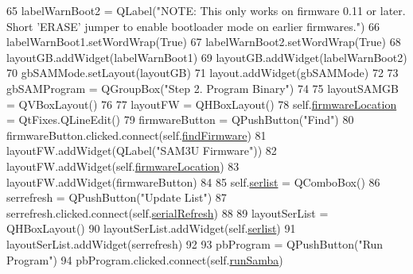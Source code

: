 \begin{DoxyCode}
65         labelWarnBoot2 = QLabel(\textcolor{stringliteral}{"NOTE: This only works on firmware 0.11 or later. Short 'ERASE' jumper to
       enable bootloader mode on earlier firmwares."})
66         labelWarnBoot1.setWordWrap(\textcolor{keyword}{True})
67         labelWarnBoot2.setWordWrap(\textcolor{keyword}{True})
68         layoutGB.addWidget(labelWarnBoot1)
69         layoutGB.addWidget(labelWarnBoot2)
70         gbSAMMode.setLayout(layoutGB)
71         layout.addWidget(gbSAMMode)
72 
73         gbSAMProgram = QGroupBox(\textcolor{stringliteral}{"Step 2. Program Binary"})
74 
75         layoutSAMGB = QVBoxLayout()
76 
77         layoutFW = QHBoxLayout()
78         self.\hyperlink{classsoftware_1_1chipwhisperer_1_1capture_1_1scopes_1_1cwhardware_1_1ChipWhispererSAM3Update_1_1SAM3LoaderConfig_aa0d7612fb970d062188efce9e01b7060}{firmwareLocation} = QtFixes.QLineEdit()
79         firmwareButton = QPushButton(\textcolor{stringliteral}{"Find"})
80         firmwareButton.clicked.connect(self.\hyperlink{classsoftware_1_1chipwhisperer_1_1capture_1_1scopes_1_1cwhardware_1_1ChipWhispererSAM3Update_1_1SAM3LoaderConfig_adcea155d6ca7dfd069080030e0464a5d}{findFirmware})
81         layoutFW.addWidget(QLabel(\textcolor{stringliteral}{"SAM3U Firmware"}))
82         layoutFW.addWidget(self.\hyperlink{classsoftware_1_1chipwhisperer_1_1capture_1_1scopes_1_1cwhardware_1_1ChipWhispererSAM3Update_1_1SAM3LoaderConfig_aa0d7612fb970d062188efce9e01b7060}{firmwareLocation})
83         layoutFW.addWidget(firmwareButton)
84 
85         self.\hyperlink{classsoftware_1_1chipwhisperer_1_1capture_1_1scopes_1_1cwhardware_1_1ChipWhispererSAM3Update_1_1SAM3LoaderConfig_afffed2030c727f2d5d6bee1538766c47}{serlist} = QComboBox()
86         serrefresh = QPushButton(\textcolor{stringliteral}{"Update List"})
87         serrefresh.clicked.connect(self.\hyperlink{classsoftware_1_1chipwhisperer_1_1capture_1_1scopes_1_1cwhardware_1_1ChipWhispererSAM3Update_1_1SAM3LoaderConfig_a8b9010d36fde24fc0fe913f557770cca}{serialRefresh})
88 
89         layoutSerList = QHBoxLayout()
90         layoutSerList.addWidget(self.\hyperlink{classsoftware_1_1chipwhisperer_1_1capture_1_1scopes_1_1cwhardware_1_1ChipWhispererSAM3Update_1_1SAM3LoaderConfig_afffed2030c727f2d5d6bee1538766c47}{serlist})
91         layoutSerList.addWidget(serrefresh)
92 
93         pbProgram = QPushButton(\textcolor{stringliteral}{"Run Program"})
94         pbProgram.clicked.connect(self.\hyperlink{classsoftware_1_1chipwhisperer_1_1capture_1_1scopes_1_1cwhardware_1_1ChipWhispererSAM3Update_1_1SAM3LoaderConfig_ab4968b339a0dc4577ee923dfdafe51d1}{runSamba})

\end{DoxyCode}
